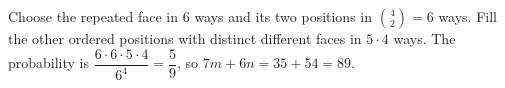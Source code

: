 Choose the repeated face in $ 6 $ ways and its two positions in $\binom42=6 $ ways. Fill the other ordered positions with distinct different faces in $ 5\cdot4 $ ways. The probability is $\dfrac{6\cdot6\cdot5\cdot4}{6^4}=\dfrac{5}{9}$, so $ 7m+6n=35+54=\boxed{89}$.
